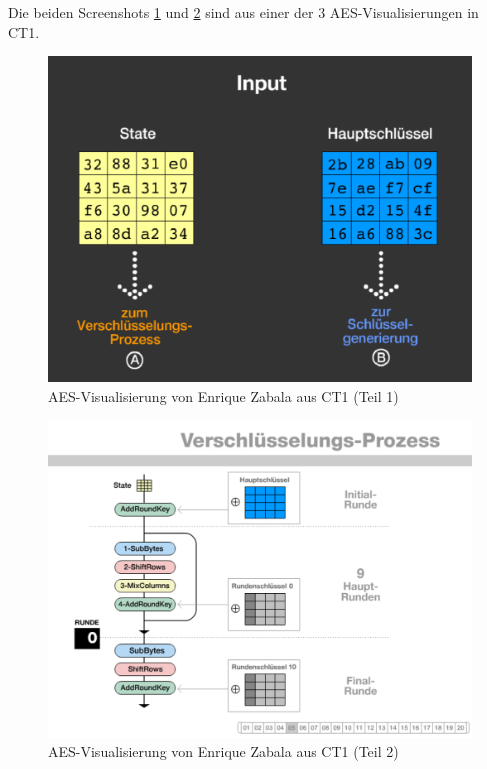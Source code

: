 \begin{refsegment}
\clearpage
Die beiden Screenshots \ref{AES-Visualization-Zabala-Flash-step3} und
\ref{AES-Visualization-Zabala-Flash-step5} sind aus einer der 3
AES-Visualisierungen in CT1.

\begin{figure}[!ht]
\begin{center}
\includegraphics[scale=0.6]{figures/AES-Visualization-Zabala-Flash-step3_de}
\caption{AES-Visualisierung von Enrique Zabala aus CT1 (Teil 1)}
\label{AES-Visualization-Zabala-Flash-step3}
\end{center}
\end{figure}

\begin{figure}[!ht]
\begin{center}
\includegraphics[scale=0.6]{figures/AES-Visualization-Zabala-Flash-step5_de}
\caption{AES-Visualisierung von Enrique Zabala aus CT1 (Teil 2)}
\label{AES-Visualization-Zabala-Flash-step5}
\end{center}
\end{figure}



\end{refsegment}
